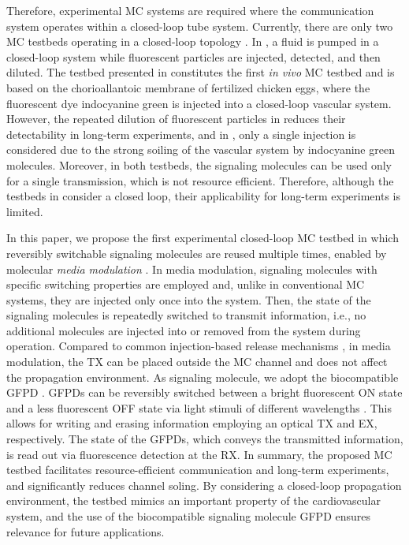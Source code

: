 Therefore, experimental \ac{MC} systems are required where the communication system operates within a closed-loop tube system. Currently, there are only two \ac{MC} testbeds operating in a closed-loop topology \cite{tuccitto2017fluorescent,schafer2024chorioallantoic}. In \cite{tuccitto2017fluorescent}, a fluid is pumped in a closed-loop system while fluorescent particles are injected, detected, and then diluted. The testbed presented in \cite{schafer2024chorioallantoic} constitutes the first \textit{in vivo} \ac{MC} testbed and is based on the chorioallantoic membrane of fertilized chicken eggs, where the fluorescent dye indocyanine green is injected into a closed-loop vascular system. However, the repeated dilution of fluorescent particles in \cite{tuccitto2017fluorescent} reduces their detectability in long-term experiments, and in \cite{schafer2024chorioallantoic}, only a single injection is considered due to the strong soiling of the vascular system by indocyanine green molecules. Moreover, in both testbeds, the signaling molecules can be used only for a single transmission, which is not resource efficient. Therefore, although the testbeds in \cite{tuccitto2017fluorescent, schafer2024chorioallantoic} consider a closed loop, their applicability for long-term experiments is limited.

In this paper, we propose the first experimental closed-loop \ac{MC} testbed in which reversibly switchable signaling molecules are reused multiple times, enabled by molecular \textit{media modulation} \cite{Brand2022MediaModulation}. In media modulation, signaling molecules with specific switching properties \cite{brand2023switchable} are employed and, unlike in conventional \ac{MC} systems, they are injected only once into the system. Then, the state of the signaling molecules is repeatedly switched to transmit information, i.e., no additional molecules are injected into or removed from the system during operation. Compared to common injection-based release mechanisms \cite{lotter2023experimental}, in media modulation, the \ac{TX} can be placed outside the \ac{MC} channel and does not affect the propagation environment.  
%
As signaling molecule, we adopt the biocompatible \ac{GFPD} \cite{richards2003safety, brakemann2011reversibly}. \acp{GFPD} can be reversibly switched between a bright fluorescent ON state and a less fluorescent OFF state via light stimuli of different wavelengths \cite{brakemann2011reversibly}. This allows for writing and erasing information employing an optical \ac{TX} and \ac{EX}, respectively. The state of the \acp{GFPD}, which conveys the transmitted information, is read out via fluorescence detection at the \ac{RX}.
In summary, the proposed \ac{MC} testbed facilitates resource-efficient communication and long-term experiments, and significantly reduces channel soling. By considering a closed-loop propagation environment, the testbed mimics an important property of the cardiovascular system, and the use of the biocompatible signaling molecule \ac{GFPD} ensures relevance for future applications. 

